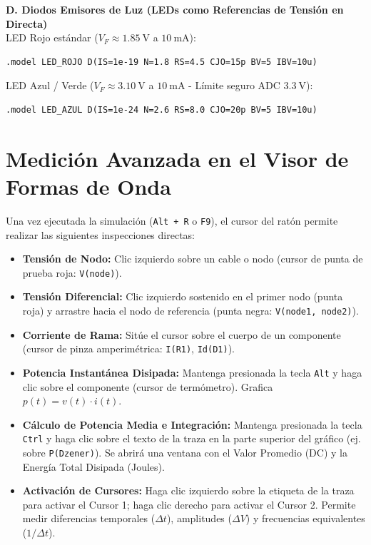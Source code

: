 \documentclass[11pt, a4paper]{article}
\begin{document}
\textbf{D. Diodos Emisores de Luz (LEDs como Referencias de Tensión en Directa)}\\
LED Rojo estándar ($V_F \approx \qty{1.85}{\volt}$ a $\qty{10}{\milli\ampere}$):
\begin{lstlisting}[style=spicestyle]
.model LED_ROJO D(IS=1e-19 N=1.8 RS=4.5 CJO=15p BV=5 IBV=10u)
\end{lstlisting}
LED Azul / Verde ($V_F \approx \qty{3.10}{\volt}$ a $\qty{10}{\milli\ampere}$ - Límite seguro ADC $\qty{3.3}{\volt}$):
\begin{lstlisting}[style=spicestyle]
.model LED_AZUL D(IS=1e-24 N=2.6 RS=8.0 CJO=20p BV=5 IBV=10u)
\end{lstlisting}

\section{Medición Avanzada en el Visor de Formas de Onda}
Una vez ejecutada la simulación (\texttt{Alt + R} o \texttt{F9}), el cursor del ratón permite realizar las siguientes inspecciones directas:
\begin{itemize}
    \item \textbf{Tensión de Nodo:} Clic izquierdo sobre un cable o nodo (cursor de punta de prueba roja: \texttt{V(node)}).
    \item \textbf{Tensión Diferencial:} Clic izquierdo sostenido en el primer nodo (punta roja) y arrastre hacia el nodo de referencia (punta negra: \texttt{V(node1, node2)}).
    \item \textbf{Corriente de Rama:} Sitúe el cursor sobre el cuerpo de un componente (cursor de pinza amperimétrica: \texttt{I(R1)}, \texttt{Id(D1)}).
    \item \textbf{Potencia Instantánea Disipada:} Mantenga presionada la tecla \texttt{Alt} y haga clic sobre el componente (cursor de termómetro). Grafica $p(t) = v(t) \cdot i(t)$.
    \item \textbf{Cálculo de Potencia Media e Integración:} Mantenga presionada la tecla \texttt{Ctrl} y haga clic sobre el texto de la traza en la parte superior del gráfico (ej. sobre \texttt{P(Dzener)}). Se abrirá una ventana con el Valor Promedio (DC) y la Energía Total Disipada (Joules).
    \item \textbf{Activación de Cursores:} Haga clic izquierdo sobre la etiqueta de la traza para activar el Cursor 1; haga clic derecho para activar el Cursor 2. Permite medir diferencias temporales ($\Delta t$), amplitudes ($\Delta V$) y frecuencias equivalentes ($1/\Delta t$).
\end{itemize}
\end{document}
